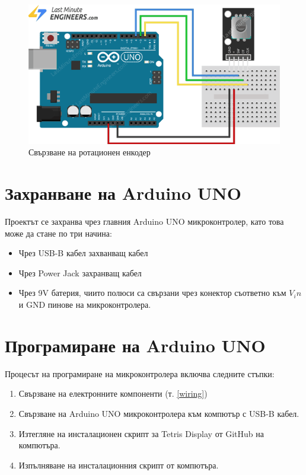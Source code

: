 \documentclass[titlepage, oneside, 14pt]{extbook}
\renewcommand{\texttt}[1]{{\small\ttfamily #1}}
\newcommand{\ard}{Arduino\texttrademark{}}
\begin{document}
\vspace{2cm}

\begin{figure}[!htbp]
    \centering
    \includegraphics[width=0.5\linewidth]{img/encoder_wiring.png}
    \caption{Свързване на ротационен енкодер}
\end{figure}

\section{Захранване на \ard{} UNO}

Проектът се захранва чрез главния \ard{} UNO микроконтролер, като това може да стане по три начина:

\begin{itemize}
  \item Чрез USB-B кабел захванващ кабел
  \item Чрез Power Jack захранващ кабел 
  \item Чрез 9V батерия, чиито полюси са свързани чрез конектор съответно към $V_in$ и GND пинове на микроконтролера.
\end{itemize}


\section{Програмиране на \ard{} UNO}

Процесът на програмиране на микроконтролера включва следните стъпки:

\begin{enumerate}
  \item Свързване на електронните компоненти (т. \ref{wiring})
  \item Свързване на \ard{} UNO микроконтролера към компютър с USB-B кабел.
  \item Изтегляне на инсталационен скрипт за Tetris Display от GitHub \cite{github} на компютъра.
  \item Изпълняване на инсталационния скрипт от компютъра.
\end{enumerate}
\end{document}
